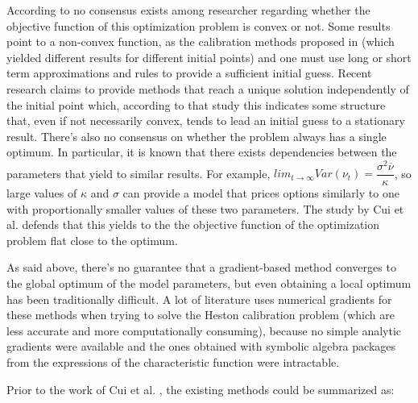 \documentclass[12,twoside]{mammeTFM}
\theoremstyle{definition}
\theoremstyle{remark}
\begin{document}
According to \cite{cui17} no consensus exists among researcher regarding whether the objective function of this optimization problem is convex or not. Some results point to a non-convex function, as the calibration methods proposed in \cite{che07, mik03} (which yielded different results for different initial points) and one must use long or short term approximations and rules to provide a sufficient initial guess. Recent research claims to provide methods that reach a unique solution independently of the initial point \cite{ger12} which, according to that study this indicates some structure that, even if not necessarily convex, tends to lead an initial guess to a stationary result.
There's also no consensus on whether the problem always has a single  optimum. In particular, it is known that there exists dependencies between the parameters that yield to similar results. For example, $lim_{t \rightarrow \infty} Var(\nu_t) = \dfrac{\sigma^2 \overline{\nu}}{\kappa}$, so large values of $\kappa$ and $\sigma$ can provide a model that prices options similarly to one with proportionally smaller values of these two parameters. The study by Cui et al. \cite{cui17} defends that this yields to the the objective function of the optimization problem flat close to the optimum.

As said above, there's no guarantee that a gradient-based method converges to the global optimum of the model parameters, but even obtaining a local optimum has been traditionally difficult. A lot of literature uses numerical gradients\cite{ger12} for these methods when trying to solve the Heston calibration problem (which are less accurate and more computationally consuming), because no simple analytic gradients were available and the ones obtained with symbolic algebra packages from the expressions of the characteristic function were intractable.

Prior to the work of Cui et al. \cite{cui17}, the existing methods could be summarized as:
\end{document}
